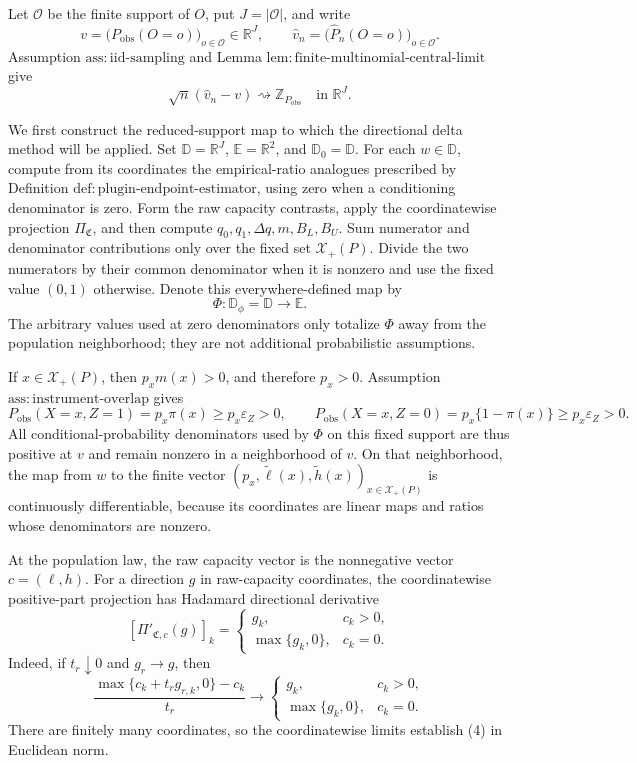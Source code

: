 Let \(\mathcal O\) be the finite support of \(O\), put \(J=|\mathcal O|\), and write
\[
v=\bigl(P_{\mathrm{obs}}(O=o)\bigr)_{o\in\mathcal O}\in\mathbb R^J,
\qquad
\widehat v_n=\bigl(\widehat P_n(O=o)\bigr)_{o\in\mathcal O}.
\]
Assumption \(\mathrm{ass{:}iid\text{-}sampling}\) and Lemma \(\mathrm{lem{:}finite\text{-}multinomial\text{-}central\text{-}limit}\) give
\[
\sqrt n(\widehat v_n-v)\rightsquigarrow\mathbb Z_{P_{\mathrm{obs}}}
\quad\text{in }\mathbb R^J.
\tag{1}
\]

We first construct the reduced-support map to which the directional delta method will be applied.  Set \(\mathbb D=\mathbb R^J\), \(\mathbb E=\mathbb R^2\), and \(\mathbb D_0=\mathbb D\).  For each \(w\in\mathbb D\), compute from its coordinates the empirical-ratio analogues prescribed by Definition \(\mathrm{def{:}plugin\text{-}endpoint\text{-}estimator}\), using zero when a conditioning denominator is zero.  Form the raw capacity contrasts, apply the coordinatewise projection \(\Pi_{\mathfrak C}\), and then compute \(q_0,q_1,\Delta q,m,B_L,B_U\).  Sum numerator and denominator contributions only over the fixed set \(\mathcal X_+(P)\).  Divide the two numerators by their common denominator when it is nonzero and use the fixed value \((0,1)\) otherwise.  Denote this everywhere-defined map by
\[
\Phi:\mathbb D_\phi=\mathbb D\longrightarrow\mathbb E.
\tag{2}
\]
The arbitrary values used at zero denominators only totalize \(\Phi\) away from the population neighborhood; they are not additional probabilistic assumptions.

If \(x\in\mathcal X_+(P)\), then \(p_xm(x)>0\), and therefore \(p_x>0\).  Assumption \(\mathrm{ass{:}instrument\text{-}overlap}\) gives
\[
P_{\mathrm{obs}}(X=x,Z=1)=p_x\pi(x)\ge p_x\varepsilon_Z>0,
\qquad
P_{\mathrm{obs}}(X=x,Z=0)=p_x\{1-\pi(x)\}\ge p_x\varepsilon_Z>0.
\tag{3}
\]
All conditional-probability denominators used by \(\Phi\) on this fixed support are thus positive at \(v\) and remain nonzero in a neighborhood of \(v\).  On that neighborhood, the map from \(w\) to the finite vector \((p_x,\widetilde\ell(x),\widetilde h(x))_{x\in\mathcal X_+(P)}\) is continuously differentiable, because its coordinates are linear maps and ratios whose denominators are nonzero.

At the population law, the raw capacity vector is the nonnegative vector \(c=(\ell,h)\).  For a direction \(g\) in raw-capacity coordinates, the coordinatewise positive-part projection has Hadamard directional derivative
\[
[\Pi'_{\mathfrak C,c}(g)]_k=
\begin{cases}
g_k,&c_k>0,\\
\max\{g_k,0\},&c_k=0.
\end{cases}
\tag{4}
\]
Indeed, if \(t_r\downarrow0\) and \(g_r\to g\), then
\[
\frac{\max\{c_k+t_rg_{r,k},0\}-c_k}{t_r}
\longrightarrow
\begin{cases}
g_k,&c_k>0,\\
\max\{g_k,0\},&c_k=0.
\end{cases}
\]
There are finitely many coordinates, so the coordinatewise limits establish (4) in Euclidean norm.

